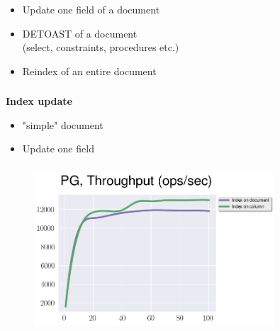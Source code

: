 \documentclass[usenames,dvipsnames, 18pt, compress, aspectratio=169]{beamer}
\begin{document}
\begin{frame}
    \frametitle{}
    \begin{center}
        \begin{itemize}[label={\MVRightarrow}]
            \item Update one field of a document
            \item DETOAST of a document\\
                (select, constraints, procedures etc.)
            \item Reindex of an entire document
        \end{itemize}
    \end{center}
\end{frame}

\begin{frame}
    \frametitle{}
    \begin{center}
        \textbf{Index update}
        \begin{itemize}[label={}]
            \item "simple" document
            \item Update one field
        \end{itemize}
    \end{center}
\end{frame}

\begin{frame}
    \frametitle{}
    \begin{center}
    \vspace{10pt}
    \begin{figure}
        \includegraphics[width=0.8\textwidth,center]{benchmarks/update_btree_wal_size_index_on_column.png}
    \end{figure}
    \end{center}
\end{frame}
\end{document}
